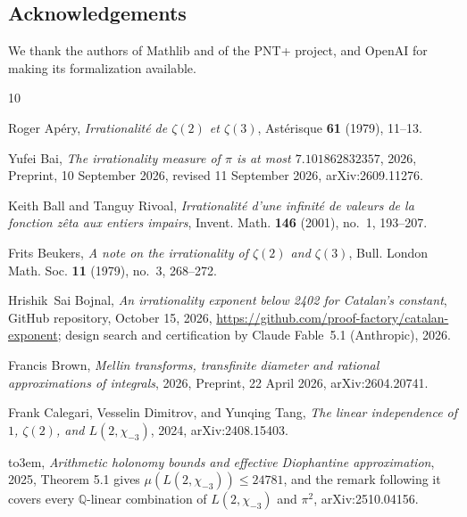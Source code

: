\documentclass[11pt]{amsart}
\theoremstyle{definition}
\theoremstyle{remark}
\numberwithin{equation}{section}
\begin{document}
\subsection*{Acknowledgements}
We thank the authors of Mathlib and of the PNT+ project, and OpenAI for making its formalization available.

\providecommand{\bysame}{\leavevmode\hbox to3em{\hrulefill}\thinspace}
\providecommand{\MR}{\relax\ifhmode\unskip\space\fi MR }
\providecommand{\MRhref}[2]{%
  \href{http://www.ams.org/mathscinet-getitem?mr=#1}{#2}
}
\providecommand{\href}[2]{#2}
\begin{thebibliography}{10}

Roger Ap\'ery, \emph{Irrationalit\'e de {$\zeta(2)$} et {$\zeta(3)$}},
  Ast\'erisque \textbf{61} (1979), 11--13.

Yufei Bai, \emph{The irrationality measure of {$\pi$} is at most
  {$7.101862832357$}}, 2026, Preprint, 10 September 2026, revised 11 September
  2026, \href{https://arxiv.org/abs/2609.11276}{arXiv:2609.11276}.

Keith Ball and Tanguy Rivoal, \emph{Irrationalit\'e d'une infinit\'e de valeurs
  de la fonction z\^eta aux entiers impairs}, Invent. Math. \textbf{146}
  (2001), no.~1, 193--207.

Frits Beukers, \emph{A note on the irrationality of {$\zeta(2)$} and
  {$\zeta(3)$}}, Bull. London Math. Soc. \textbf{11} (1979), no.~3, 268--272.

Hrishik~Sai Bojnal, \emph{An irrationality exponent below 2402 for {C}atalan's
  constant}, GitHub repository, October 15, 2026,
  \url{https://github.com/proof-factory/catalan-exponent}; design search and
  certification by Claude Fable~5.1 (Anthropic), 2026.

Francis Brown, \emph{Mellin transforms, transfinite diameter and rational
  approximations of integrals}, 2026, Preprint, 22 April 2026,
  \href{https://arxiv.org/abs/2604.20741}{arXiv:2604.20741}.

Frank Calegari, Vesselin Dimitrov, and Yunqing Tang, \emph{The linear
  independence of {$1$}, {$\zeta(2)$}, and {$L(2,\chi_{-3})$}}, 2024,
  \href{https://arxiv.org/abs/2408.15403}{arXiv:2408.15403}.

\bysame, \emph{Arithmetic holonomy bounds and effective {D}iophantine
  approximation}, 2025, Theorem 5.1 gives $\mu(L(2,\chi_{-3}))\le 24781$, and
  the remark following it covers every $\mathbb{Q}$-linear combination of
  $L(2,\chi_{-3})$ and $\pi^2$,
  \href{https://arxiv.org/abs/2510.04156}{arXiv:2510.04156}.


\end{thebibliography}
\end{document}
